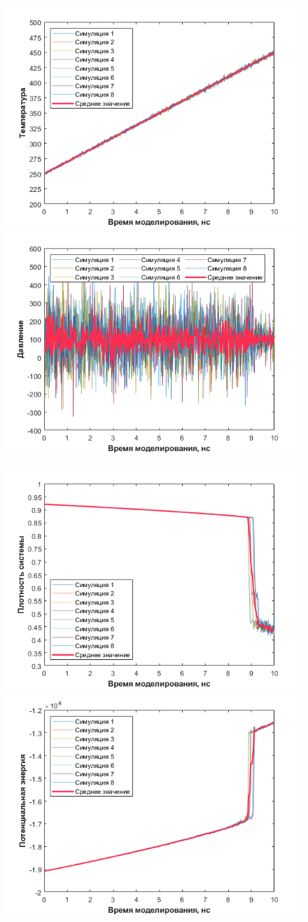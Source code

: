 \begin{figure}[H]
    \centering
    \begin{minipage}{\linewidth}
        \includegraphics[width=.5\linewidth]{figures/temp.png}\hfill
        \includegraphics[width=.5\linewidth]{figures/press.png}
    \end{minipage}
    \begin{minipage}{\linewidth}
        \includegraphics[width=.5\linewidth]{figures/density.png}\hfill
        \includegraphics[width=.5\linewidth]{figures/pe.png}
    \end{minipage}

\end{figure}
